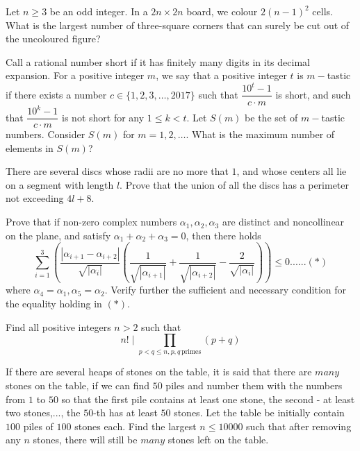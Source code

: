 \documentclass[11pt]{scrartcl}
\begin{document}
\begin{problem}[6837149463099766937]
	Let $n \ge 3$ be an odd integer. In a $2n \times 2n$ board, we colour $2(n-1)^2$ cells. What is the largest number of three-square corners that can surely be cut out of the uncoloured figure?
\end{problem}
\begin{problem}[6848161986234395515]
Call a rational number short if it has finitely many digits in its decimal expansion. For a positive integer $m$, we say that a positive integer $t$ is $m-$tastic if there exists a number $c\in \{1,2,3,\ldots ,2017\}$ such that $\dfrac{10^t-1}{c\cdot m}$ is short, and such that $\dfrac{10^k-1}{c\cdot m}$ is not short for any $1\le k<t$. Let $S(m)$ be the set of $m-$tastic numbers. Consider $S(m)$ for $m=1,2,\ldots{}.$ What is the maximum number of elements in $S(m)$?
\end{problem}
\begin{problem}[6851509563331617580]
There are several discs whose radii are no more that $1$, and whose centers all lie on a segment with length ${l}$. Prove that the union of all the discs has a perimeter not exceeding $4l+8$.
\end{problem}
\begin{problem}[6856925961374811551]
Prove that if non-zero complex numbers $\alpha_1,\alpha_2,\alpha_3$ are distinct and noncollinear on the plane, and satisfy $\alpha_1+\alpha_2+\alpha_3=0$, then there holds
\[\sum_{i=1}^{3}\left(\frac{|\alpha_{i+1}-\alpha_{i+2}|}{\sqrt{|\alpha_i|}}\left(\frac{1}{\sqrt{|\alpha_{i+1}|}}+\frac{1}{\sqrt{|\alpha_{i+2}|}}-\frac{2}{\sqrt{|\alpha_{i}|}}\right)\right)\leq 0......(*)\]where $\alpha_4=\alpha_1, \alpha_5=\alpha_2$. Verify further the sufficient and necessary condition for the equality holding in $(*)$.
\end{problem}
\begin{problem}[6919176010062551987]
Find all positive integers $n>2$ such that
$$ n! \mid \prod_{ p<q\le n, p,q \, \text{primes}} (p+q)$$
\end{problem}
\begin{problem}[6955756846906975678]
If there are several heaps of stones on the table, it is said that there are $\textit{many}$ stones on the table, if we can find $50$ piles and number them with the numbers from $1$ to $50$ so that the first pile contains at least one stone, the second - at least two stones,..., the $50$-th has at least $50$ stones. Let the table be initially contain $100$ piles of $100$ stones each. Find the largest $n \leq 10 000$ such that after removing any $n$ stones, there will still be $\textit{many}$ stones left on the table.
\end{problem}
\end{document}
